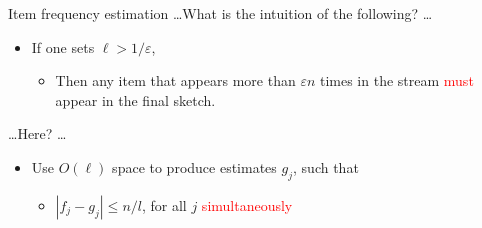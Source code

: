 \documentclass[first=dgreen,second=purple,logo=redque]{aaltoslides}
\newcommand{\vectornorm}[1]{\left\|#1\right\|}
\begin{document}
\begin{frame}[allowframebreaks=1]{Item frequency estimation}
\ldots What is the intuition of the following? \ldots

\begin{itemize}
  \item If one sets $\ell > 1/\varepsilon$,
  \begin{itemize} \item Then any item that appears \textcolor{dgreen}{more than}
  $\varepsilon n$ times in the stream \textcolor{red}{must} appear in
  the final sketch.\end{itemize}
\end{itemize}

\ldots Here? \ldots

\begin{itemize}
	\item Use $O(\ell)$ space to produce estimates $g_{j}$, such
	that
	\begin{itemize}
		\item{$|f_{j} - g_{j} | \leq n/l$}, for all $j$ \textcolor{red}{simultaneously}
	\end{itemize}
\end{itemize}

  
\end{frame}


%  	
\end{document}
